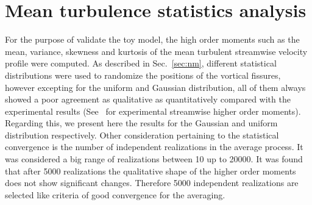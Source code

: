 \documentclass[aps,reprint,amsmath,amssymb,pra]{revtex4-1}%
\begin{document}
\section{Mean turbulence statistics analysis}
For the purpose of validate the toy model, the high order moments such as the mean, variance, skewness and kurtosis of the mean turbulent streamwise velocity profile were computed. As described in Sec.~\ref{sec:nm}, different statistical distributions were used to randomize the positions of the vortical fissures, however excepting for the uniform and Gaussian distribution, all of them always showed a poor agreement as qualitative as quantitatively compared with the experimental results (See~\cite{Vincenti2013} for experimental streamwise higher order moments). Regarding this, we present here the results for the Gaussian and uniform distribution respectively. Other consideration pertaining to the statistical convergence is the number of independent realizations in the average process. It was considered a big range of realizations between 10 up to 20000. It was found that after 5000 realizations the qualitative shape of the higher order moments does not show significant changes. Therefore 5000 independent realizations are selected like criteria of good convergence for the averaging. 
\end{document}
